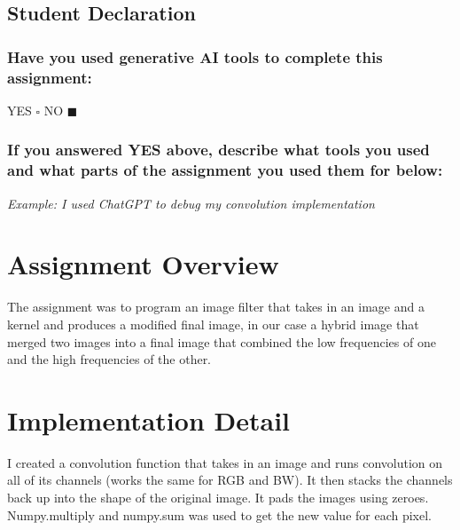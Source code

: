 \subsection*{Student Declaration}

\subsubsection*{Have you used generative AI tools to complete this assignment:}


YES $\square$ NO $\blacksquare$ %


\subsubsection*{If you answered YES above, describe what tools you used and what parts of the assignment you used them for below:}


\textit{Example: I used ChatGPT to debug my convolution implementation}


\newpage

\section*{Assignment Overview}

The assignment was to program an image filter that takes in an image and a kernel and produces a modified final image, in our case a hybrid image that merged two images into a final image
that combined the low frequencies of one and the high frequencies of the other.

\section*{Implementation Detail}

I created a convolution function that takes in an image and runs convolution on all of its channels (works the same for RGB and BW). It then stacks the channels back up into the shape
of the original image. It pads the images using zeroes. Numpy.multiply and numpy.sum was used to get the new value for each pixel.

